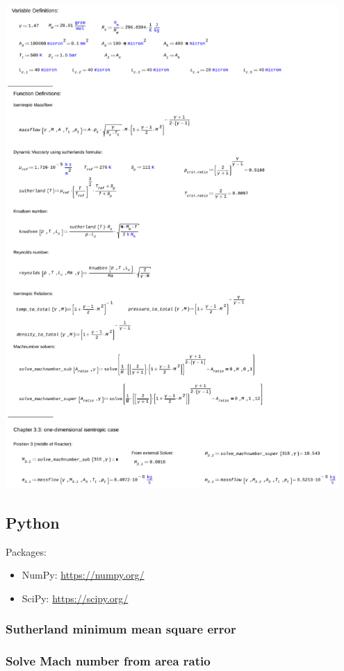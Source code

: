 \includegraphics[page=3, width=0.95\textwidth]{code/calculations_thesis.pdf}
\newpage

\subsection{Python}
Packages:
\begin{itemize}
	\item NumPy: \quad \url{https://numpy.org/}
	\item SciPy: \quad \url{https://scipy.org/}
\end{itemize}
\subsubsection{Sutherland minimum mean square error}
\label{apx:sutherland-py}


\subsubsection{Solve Mach number from area ratio}
\label{apx:mach-py}

